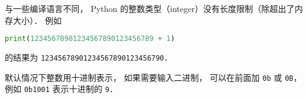 
与一些编译语言不同， Python 的整数类型（integer）没有长度限制（除超出了内存大小）． 例如
\begin{lstlisting}[language=python]
print(12345678901234567890123456789 + 1)
\end{lstlisting}
的结果为 \verb|12345678901234567890123456790|．

默认情况下整数用十进制表示， 如果需要输入二进制， 可以在前面加 \verb|0b| 或 \verb|0B|， 例如 \verb|0b1001| 表示十进制的 \verb|9|．
